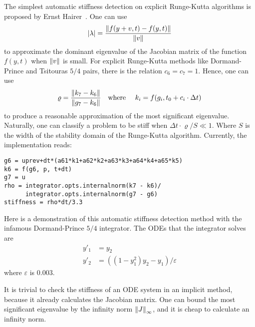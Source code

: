 \documentclass[12pt,a4paper]{article}
\begin{document}
The simplest automatic stiffness detection on explicit Runge-Kutta algorithms
is proposed by Ernst Hairer~\cite{hairer2}. One can use
\begin{equation}
  \abs{\lambda} = \frac{\norm{f(y+v, t)-f(y, t)}}{\norm{v}}
\end{equation}
to approximate the dominant eigenvalue of the Jacobian matrix of the function
$f(y, t)$ when $\norm{v}$ is small. For explicit Runge-Kutta methods like
Dormand-Prince and Tsitouras $5/4$ pairs, there is the relation $c_6 = c_7 =
1$. Hence, one can use
\begin{equation}
  \varrho = \frac{\norm{k_7-k_6}}{\norm{g_7-k_6}}\qqtext{where } k_i = f(g_i,
  t_0 + c_i\cdot \Delta t)
\end{equation}
to produce a reasonable approximation of the most significant eigenvalue.
Naturally, one can classify a problem to be stiff when $\Delta
t\cdot\varrho/S \ll 1$. Where $S$ is the width of the stability domain of the
Runge-Kutta algorithm. Currently, the implementation reads:

\begin{lstlisting}
g6 = uprev+dt*(a61*k1+a62*k2+a63*k3+a64*k4+a65*k5)
k6 = f(g6, p, t+dt)
g7 = u
rho = integrator.opts.internalnorm(k7 - k6)/
      integrator.opts.internalnorm(g7 - g6)
stiffness = rho*dt/3.3
\end{lstlisting}

Here is a demonstration of this automatic stiffness detection method with the
infamous Dormand-Prince $5/4$ integrator. The ODEs that the integrator solves
are
\begin{align}
  y'_1 &= y_2\\
  y'_2 &= ((1-y_1^2)y_2-y_1) / \varepsilon
\end{align}
where $\varepsilon$ is $0.003$.



%
%

It is trivial to check the stiffness of an ODE system in an implicit method,
because it already calculates the Jacobian matrix. One can bound the most
significant eigenvalue by the infinity norm $\norm{J}_{\infty}$, and it is
cheap to calculate an infinity norm.
\end{document}
